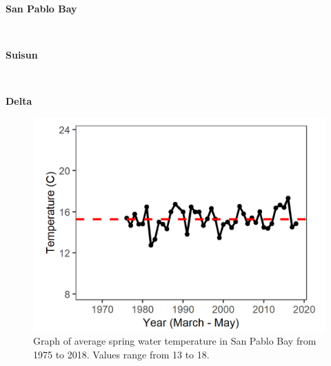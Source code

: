 \documentclass[
]{book}
\begin{document}
\begin{panel-grid}

\begin{columns-nocenter}

\begin{column800}

\textbf{San Pablo Bay}

\end{column800}

\begin{column40}

~

\end{column40}

\begin{column800}

\textbf{Suisun}

\end{column800}

\begin{column40}

~

\end{column40}

\begin{column800}

\textbf{Delta}

\end{column800}

\end{columns-nocenter}

\begin{columns-nocenter}

\begin{column800}

\begin{expand}

\begin{figure}
\includegraphics[width=15.25in]{figures/temp_splspring} \caption{Graph of average spring water temperature in San Pablo Bay from 1975 to 2018. Values range from 13 to 18.}\label{fig:unnamed-chunk-14}
\end{figure}


\end{expand}
\end{column800}
\end{columns-nocenter}
\end{panel-grid}
\end{document}
